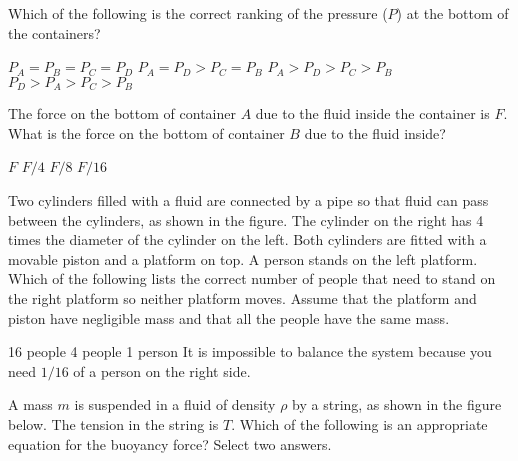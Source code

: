 \documentclass{../../../oss-ap12ibhl}
\begin{document}
\begin{questions}
    
  \question Which of the following is the correct ranking of the pressure ($P$)
  at the bottom of the containers?
  \label{cyl1}
  \begin{choices}
    \choice $P_A = P_B = P_C = P_D$
    \choice $P_A = P_D > P_C = P_B$
    \choice $P_A > P_D > P_C > P_B$
    \choice $P_D > P_A > P_C > P_B$
  \end{choices}
    
  \question The force on the bottom of container $A$ due to the fluid inside the
  container is $F$. What is the force on the bottom of container $B$ due to
  the fluid inside?
  \label{cyl2}
  \begin{choices}
    \choice $F$
    \choice $F/4$
    \choice $F/8$
    \choice $F/16$
  \end{choices}

  \question Two cylinders filled with a fluid are connected by a pipe so that
  fluid can pass between the cylinders, as shown in the figure. The cylinder on
  the right has 4 times the diameter of the cylinder on the left. Both cylinders
  are fitted with a movable piston and a platform on top. A person stands on
  the left platform. Which of the following lists the correct number of people
  that need to stand on the right platform so neither platform moves. Assume
  that the platform and piston have negligible mass and that all the people
  have the same mass.

  \begin{minipage}{.4\textwidth}
  \end{minipage}
  \begin{minipage}{.58\textwidth}
    \begin{choices}
      \choice \num{16} people
      \choice \num{4} people
      \choice \num{1} person
      \choice It is impossible to balance the system because you need $1/16$ of
      a person on the right side.
    \end{choices}
  \end{minipage}
  \newpage
    
  \question A mass $m$ is suspended in a fluid of density $\rho$ by a string, as
  shown in the figure below. The tension in the string is $T$. Which of the
  following is an appropriate equation for the buoyancy force? Select two
  answers.
  

\end{questions}
\end{document}
